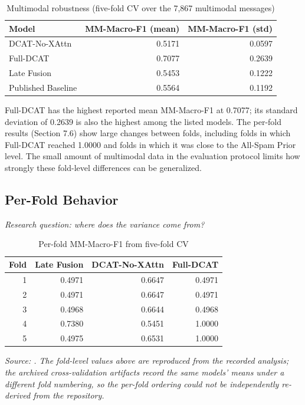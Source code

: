 \documentclass[10pt,twoside]{article}
\begin{document}
\begin{table}[t]
\centering
\caption{Multimodal robustness (five-fold CV over the 7,867 multimodal messages)}
\label{tab:cv}
\small
\begin{tabular}{lrr}\toprule
Model & MM-Macro-F1 (mean) & MM-Macro-F1 (std) \\
\midrule
DCAT-No-XAttn & 0.5171 & 0.0597 \\
Full-DCAT & 0.7077 & 0.2639 \\
Late Fusion & 0.5453 & 0.1222 \\
Published Baseline & 0.5564 & 0.1192 \\
\bottomrule
\end{tabular}

\end{table}

Full-DCAT has the highest reported mean MM-Macro-F1 at 0.7077; its standard deviation of 0.2639 is also the highest among the listed models. The per-fold results (Section 7.6) show large changes between folds, including folds in which Full-DCAT reached 1.0000 and folds in which it was close to the All-Spam Prior level. The small amount of multimodal data in the evaluation protocol limits how strongly these fold-level differences can be generalized.

\subsection{Per-Fold Behavior}\label{sec:7.6}

\emph{Research question: where does the variance come from?}

\begin{table}[t]
\centering
\caption{Per-fold MM-Macro-F1 from five-fold CV}
\label{tab:folds}
\small
\begin{tabular}{rrrr}\toprule
Fold & Late Fusion & DCAT-No-XAttn & Full-DCAT \\
\midrule
1 & 0.4971 & 0.6647 & 0.4971 \\
2 & 0.4971 & 0.6647 & 0.4971 \\
3 & 0.4968 & 0.6644 & 0.4968 \\
4 & 0.7380 & 0.5451 & 1.0000 \\
5 & 0.4975 & 0.6531 & 1.0000 \\
\bottomrule
\end{tabular}

{\footnotesize\itshape \emph{Source: .} The fold-level values above are reproduced from the recorded analysis; the archived cross-validation artifacts record the same models' means under a different fold numbering, so the per-fold ordering could not be independently re-derived from the repository.\par}

\end{table}
\end{document}
